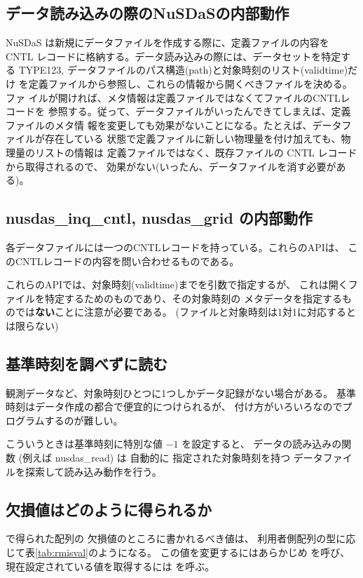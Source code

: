 \subsection{データ読み込みの際のNuSDaSの内部動作}
NuSDaS は新規にデータファイルを作成する際に、定義ファイルの内容を CNTL
レコードに格納する。データ読み込みの際には、データセットを特定する
TYPE123, データファイルのパス構造(path)と対象時刻のリスト(validtime)だけ
を定義ファイルから参照し、これらの情報から開くべきファイルを決める。ファ
イルが開ければ、メタ情報は定義ファイルではなくてファイルのCNTLレコードを
参照する。従って、データファイルがいったんできてしまえば、定義ファイルのメタ情
報を変更しても効果がないことになる。たとえば、データファイルが存在している
状態で定義ファイルに新しい物理量を付け加えても、物理量のリストの情報は
定義ファイルではなく、既存ファイルの CNTL レコードから取得されるので、
効果がない(いったん、データファイルを消す必要がある)。

\subsection{nusdas\_inq\_cntl, nusdas\_grid の内部動作}
各データファイルには一つのCNTLレコードを持っている。これらのAPIは、
このCNTLレコードの内容を問い合わせるものである。

これらのAPIでは、対象時刻(validtime)までを引数で指定するが、
これは開くファイルを特定するためのものであり、その対象時刻の
メタデータを指定するものでは{\bf ない}ことに注意が必要である。
(ファイルと対象時刻は1対1に対応するとは限らない)

\subsection{基準時刻を調べずに読む}

観測データなど、対象時刻ひとつに1つしかデータ記録がない場合がある。
基準時刻はデータ作成の都合で便宜的につけられるが、
付け方がいろいろなのでプログラムするのが難しい。

こういうときは基準時刻に特別な値 $-1$ を設定すると、
データの読み込みの関数 (例えば nusdas\_read) は
自動的に
指定された対象時刻を持つ
データファイルを探索して読み込み動作を行う。

\subsection{欠損値はどのように得られるか}

で得られた配列の
欠損値のところに書かれるべき値は、
利用者側配列の型に応じて表\ref{tab:rmisval}のようになる。
この値を変更するにはあらかじめ
を呼び、現在設定されている値を取得するには
を呼ぶ。

